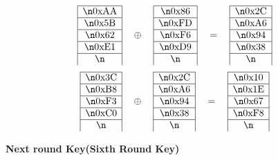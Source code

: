 \[\begin{align*}
        \end{align*}
        \]\[
        \begin{align*}
            & 
            \begin{array}{|c|}\hline\n\text{0xAA} \\ \hline\n\text{0x5B} \\ \hline\n\text{0x62} \\ \hline\n\text{0xE1} \\ \hline\n\end{array} 
            \quad \oplus \quad
            \begin{array}{|c|}\hline\n\text{0x86} \\ \hline\n\text{0xFD} \\ \hline\n\text{0xF6} \\ \hline\n\text{0xD9} \\ \hline\n\end{array} 
            \quad = \quad
            \begin{array}{|c|}\hline\n\text{0x2C} \\ \hline\n\text{0xA6} \\ \hline\n\text{0x94} \\ \hline\n\text{0x38} \\ \hline\n\end{array}
        \end{align*}
        \]\[
        \begin{align*}
            & 
            \begin{array}{|c|}\hline\n\text{0x3C} \\ \hline\n\text{0xB8} \\ \hline\n\text{0xF3} \\ \hline\n\text{0xC0} \\ \hline\n\end{array} 
            \quad \oplus \quad
            \begin{array}{|c|}\hline\n\text{0x2C} \\ \hline\n\text{0xA6} \\ \hline\n\text{0x94} \\ \hline\n\text{0x38} \\ \hline\n\end{array} 
            \quad = \quad
            \begin{array}{|c|}\hline\n\text{0x10} \\ \hline\n\text{0x1E} \\ \hline\n\text{0x67} \\ \hline\n\text{0xF8} \\ \hline\n\end{array}
        \end{align*}
        \]\item \textbf{Next round Key(Sixth Round Key)}

